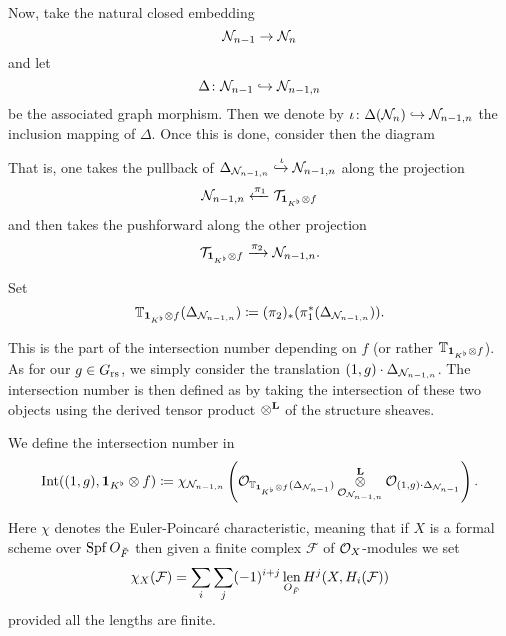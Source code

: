 Now, take the natural closed embedding
\[ \mathcal N_{n-1} \to \mathcal N_n \]
and let
\[ \Delta \colon \mathcal N_{n-1} \hookrightarrow \mathcal N_{n-1,n} \]
be the associated graph morphism.
Then we denote by $\iota \colon \Delta(\mathcal N_n) \hookrightarrow \mathcal N_{n-1,n}$
the inclusion mapping of $\Delta$.
Once this is done, consider then the diagram
\begin{center}
\end{center}
That is, one takes the pullback of
$\Delta_{\mathcal N_{n-1,n}} \xhookrightarrow{\iota} \mathcal N_{n-1,n}$
along the projection
\[ \mathcal N_{n-1,n} \xleftarrow{\pi_1} \mathcal{T}_{\mathbf{1}_{K^\flat} \otimes f} \]
and then takes the pushforward along the other projection
\[ \mathcal{T}_{\mathbf{1}_{K^\flat} \otimes f} \xrightarrow{\pi_2} \mathcal N_{n-1,n}. \]
\begin{definition}
  Set
  \[
    \mathbb T_{\mathbf{1}_{K^\flat} \otimes f} (\Delta_{\mathcal N_{n-1,n}})
    \coloneqq (\pi_2)_\ast(\pi_1^\ast(\Delta_{\mathcal N_{n-1,n}})).
  \]
\end{definition}
This is the part of the intersection number depending on $f$
(or rather $\mathbb T_{\mathbf{1}_{K^\flat} \otimes f}$).
As for our $g \in G_{\mathrm{rs}}$, we simply consider the translation $(1,g) \cdot \Delta_{\mathcal N_{n-1,n}}$.
The intersection number is then defined as by taking the intersection
of these two objects using the derived tensor product $\mathop{\otimes}^{\mathbf{L}}$ of the structure sheaves.
\begin{definition}
  We define the intersection number in 
  \[
    \operatorname{Int}((1,g), \mathbf{1}_{K^\flat} \otimes f)
    \coloneqq \chi_{\mathcal N_{n-1,n}} \left(
      \mathcal{O}_{\mathbb T_{\mathbf{1}_{K^\flat} \otimes f} (\Delta_{\mathcal N_{n-1}})}
      \mathop{\otimes}^{\mathbf{L}}_{\mathcal{O}_{\mathcal N_{n-1,n}}} \mathcal{O}_{(1,g) \cdot \Delta_{\mathcal N_{n-1}}} \right).
  \]
\end{definition}
Here $\chi$ denotes the Euler-Poincar\'{e} characteristic,
meaning that if $X$ is a formal scheme over $\operatorname{Spf} O_{\breve F}$
then given a finite complex $\mathcal{F}$ of $\mathcal{O}_X$-modules we set
\[ \chi_X(\mathcal{F}) = \sum_i \sum_j (-1)^{i+j}
  \operatorname*{len}_{O_{\breve F}} H^j(X, H_i(\mathcal F)) \]
provided all the lengths are finite.


